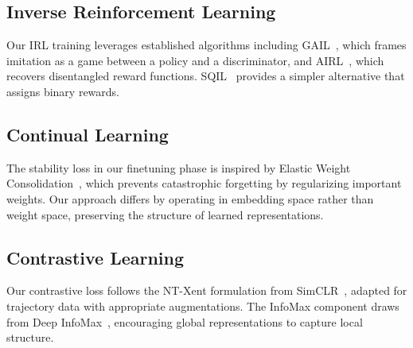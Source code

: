 \documentclass{article}
\begin{document}
\subsection{Inverse Reinforcement Learning}

Our IRL training leverages established algorithms including GAIL~\cite{ho2016generative}, which frames imitation as a game between a policy and a discriminator, and AIRL~\cite{fu2018learning}, which recovers disentangled reward functions. SQIL~\cite{reddy2020sqil} provides a simpler alternative that assigns binary rewards.

\subsection{Continual Learning}

The stability loss in our finetuning phase is inspired by Elastic Weight Consolidation~\cite{kirkpatrick2017overcoming}, which prevents catastrophic forgetting by regularizing important weights. Our approach differs by operating in embedding space rather than weight space, preserving the structure of learned representations.

\subsection{Contrastive Learning}

Our contrastive loss follows the NT-Xent formulation from SimCLR~\cite{chen2020simple}, adapted for trajectory data with appropriate augmentations. The InfoMax component draws from Deep InfoMax~\cite{hjelm2018learning}, encouraging global representations to capture local structure.
\end{document}
